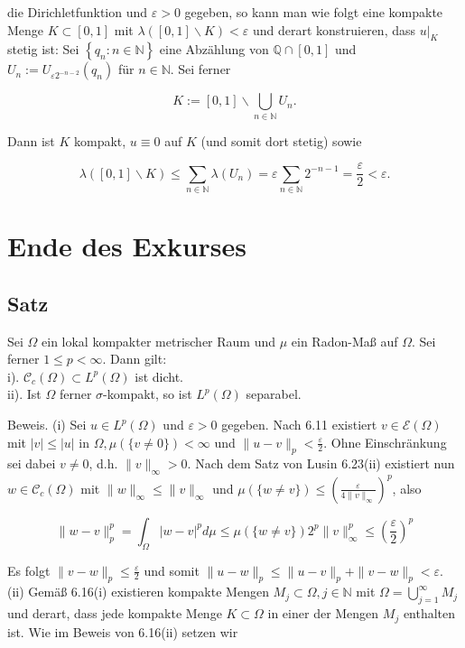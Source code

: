 \documentclass[10pt, letterpaper]{article}
\begin{document}
die Dirichletfunktion und $\varepsilon>0$ gegeben, so kann man wie folgt eine kompakte Menge $K \subset[0,1]$ mit $\lambda([0,1] \backslash K)<\varepsilon$ und derart konstruieren, dass $\left.u\right|_{K}$ stetig ist: Sei $\left\{q_{n}: n \in \mathbb{N}\right\}$ eine Abzählung von $\mathbb{Q} \cap[0,1]$ und $U_{n}:=U_{\varepsilon 2^{-n-2}}\left(q_{n}\right)$ für $n \in \mathbb{N}$. Sei ferner

$$
K:=[0,1] \backslash \bigcup_{n \in \mathbb{N}} U_{n} .
$$

Dann ist $K$ kompakt, $u \equiv 0$ auf $K$ (und somit dort stetig) sowie

$$
\lambda([0,1] \backslash K) \leq \sum_{n \in \mathbb{N}} \lambda\left(U_{n}\right)=\varepsilon \sum_{n \in \mathbb{N}} 2^{-n-1}=\frac{\varepsilon}{2}<\varepsilon .
$$

\section*{Ende des Exkurses}
\subsection*{Satz}
Sei $\Omega$ ein lokal kompakter metrischer Raum und $\mu$ ein Radon-Maß auf $\Omega$. Sei ferner $1 \leq p<\infty$. Dann gilt:\\
i). $\mathcal{C}_{c}(\Omega) \subset L^{p}(\Omega)$ ist dicht.\\
ii). Ist $\Omega$ ferner $\sigma$-kompakt, so ist $L^{p}(\Omega)$ separabel.

Beweis. (i) Sei $u \in L^{p}(\Omega)$ und $\varepsilon>0$ gegeben. Nach 6.11 existiert $v \in \mathcal{E}(\Omega)$ mit $|v| \leq|u|$ in $\Omega, \mu(\{v \neq 0\})<\infty$ und $\|u-v\|_{p}<\frac{\varepsilon}{2}$. Ohne Einschränkung sei dabei $v \neq 0$, d.h. $\|v\|_{\infty}>0$. Nach dem Satz von Lusin 6.23(ii) existiert nun $w \in \mathcal{C}_{c}(\Omega)$ mit $\|w\|_{\infty} \leq\|v\|_{\infty}$ und $\mu(\{w \neq v\}) \leq\left(\frac{\varepsilon}{4\|v\|_{\infty}}\right)^{p}$, also

$$
\|w-v\|_{p}^{p}=\int_{\Omega}|w-v|^{p} d \mu \leq \mu(\{w \neq v\}) 2^{p}\|v\|_{\infty}^{p} \leq\left(\frac{\varepsilon}{2}\right)^{p}
$$

Es folgt $\|v-w\|_{p} \leq \frac{\varepsilon}{2}$ und somit $\|u-w\|_{p} \leq\|u-v\|_{p}+\|v-w\|_{p}<\varepsilon$.\\
(ii) Gemäß 6.16(i) existieren kompakte Mengen $M_{j} \subset \Omega, j \in \mathbb{N}$ mit $\Omega=\bigcup_{j=1}^{\infty} M_{j}$ und derart, dass jede kompakte Menge $K \subset \Omega$ in einer der Mengen $M_{j}$ enthalten ist. Wie im Beweis von 6.16(ii) setzen wir
\end{document}
